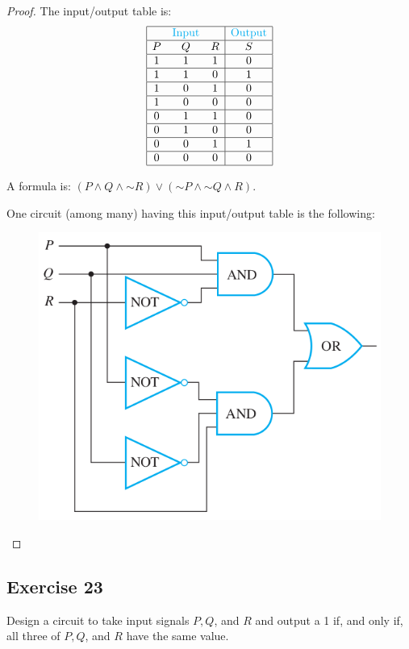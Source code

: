 \documentclass[14pt]{extarticle}
\begin{document}
\begin{proof} The input/output table is:
$$ \begin{array}{|ccc|c|} \hline & \color{cyan}\text{Input} & &
\color{cyan}\text{Output} \\ \hline P&Q&R&S\\ \hline 1&1&1&0\\ \hline 1&1&0&1\\
\hline 1&0&1&0\\ \hline 1&0&0&0\\ \hline 0&1&1&0\\ \hline 0&1&0&0\\ \hline
0&0&1&1\\ \hline 0&0&0&0\\ \hline \end{array} $$

A formula is: $(P \wedge Q \wedge {\sim R}) \vee ({\sim P} \wedge {\sim Q}
\wedge R)$.

One circuit (among many) having this input/output table is the following:

\begin{figure}[ht!] \centering \includegraphics[scale=0.5]{../images/2.4.22.png}
\end{figure} \end{proof}

\subsection{Exercise 23} Design a circuit to take input signals $P, Q$, and $R$
and output a 1 if, and only if, all three of $P, Q$, and $R$ have the same
value.
\end{document}
